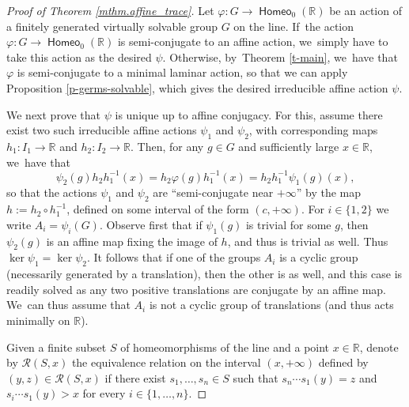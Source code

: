 \documentclass[JEP,XML,SOM,Unicode,NoFloatCountersInSection,published]{cedram}
\theoremstyle{definition}
\DeclareMathOperator{\homeo}{\mathsf{Homeo}}
\newcommand{\R}{\mathbb{R}}
\begin{document}
\begin{proof}[Proof of Theorem \ref{mthm.affine_trace}] Let $\varphi\colon G\to \homeo_0(\R)$ be an action of a finitely generated virtually solvable group $G$ on the line. If~the action $\varphi\colon G\to \homeo_0(\R)$ is semi-conjugate to an affine action, we~simply have to take this action as the desired $\psi$. Otherwise, by~Theorem \ref{t-main}, we~have that $\varphi$ is semi-conjugate to a minimal laminar action, so that we can apply Proposition \ref{p-germs-solvable}, which gives the desired irreducible affine action $\psi$.

We next prove that $\psi$ is unique up to affine conjugacy.
For this, assume there exist two such irreducible affine actions $\psi_1$ and $\psi_2$, with corresponding maps $h_1\colon I_1\to \R$ and $h_2\colon I_2\to \R$. Then, for any $g\in G$ and sufficiently large $x\in \R$, we~have that
\[
\psi_2(g)h_2h_1^{-1}(x)=h_2\varphi(g)h_1^{-1}(x)=h_2h_1^{-1}\psi_1(g)(x),
\]
so that the actions $\psi_1$ and $\psi_2$ are ``semi-conjugate near $+\infty$'' by the map $h:= h_2\circ h_1^{-1}$, defined on some interval of the form $(c,+\infty)$.
For $i\in \{1,2\}$ we write $A_i=\psi_i(G)$. Observe first that if $\psi_1(g)$ is trivial for some $g$, then $\psi_2(g)$ is an affine map fixing the image of $h$, and thus is trivial as well. Thus $\ker \psi_1=\ker \psi_2$.
It follows that if one of the groups $A_i$ is a cyclic group (necessarily generated by a translation), then the other is as well, and this case is readily solved as any two positive translations are conjugate by an affine map. We~can thus assume that $A_i$ is not a cyclic group of translations (and thus acts minimally on $\R$).

Given a finite subset $S$ of homeomorphisms of the line and a point $x\in \R$, denote by $\mathcal{R}(S, x)$ the equivalence relation on the interval $(x, +\infty)$ defined by $(y, z)\in \mathcal{R}(S, x)$ if there exist $s_1,\ldots, s_n\in S$ such that $s_n\cdots s_1(y)=z$ and $s_i\cdots s_1(y)>x$ for every $i\in \{1,\ldots, n\}$.


\end{proof}
\end{document}
